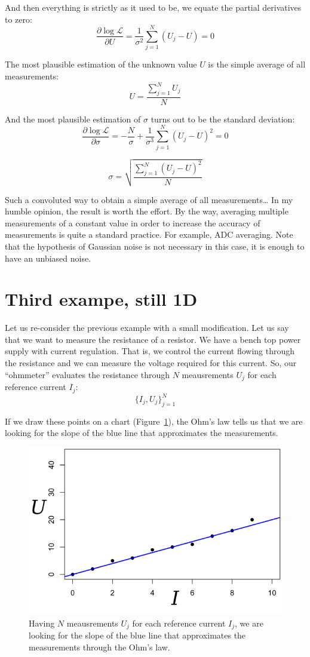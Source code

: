 \documentclass[notitlepage]{report}
\begin{document}
And then everything is strictly as it used to be, we equate the partial derivatives to zero:
$$
\frac{\partial\log\mathcal{L}}{\partial U}    =  \frac{1}{\sigma^2}\sum\limits_{j=1}^N (U_j-U) = 0 
$$

The most plausible estimation of the unknown value $U$ is the simple average of all measurements:
$$
U = \frac{\sum\limits_{j=1}^N U_j}{N}
$$

And the most plausible estimation of $\sigma$ turns out to be the standard deviation:
$$
\frac{\partial\log\mathcal{L}}{\partial\sigma} =  -\frac{N}{\sigma} + \frac{1}{\sigma^3}\sum\limits_{j=1}^N (U_j-U)^2 = 0
$$

$$
\sigma = \sqrt{\frac{\sum\limits_{j=1}^N (U_j-U)^2}{N}} 
$$

Such a convoluted way to obtain a simple average of all measurements\dots
In my humble opinion, the result is worth the effort.
By the way, averaging multiple measurements of a constant value in order to increase the accuracy of measurements is quite a standard practice.
For example, ADC averaging. Note that the hypothesis of Gaussian noise is not necessary in this case, it is enough to have an unbiased noise.


\section{Third exampe, still 1D}

Let us re-consider the previous example with a small modification.
Let us say that we want to measure the resistance of a resistor.
We have a bench top power supply with current regulation.
That is, we control the current flowing through the resistance and we can measure the voltage required for this current.
So, our ``ohmmeter'' evaluates the resistance through $N$ meausrements $U_j$ for each reference current $I_j$:
$$
\{I_j, U_j\}_{j=1}^{N}
$$

If we draw these points on a chart (Figure~\ref{fig:URI}), the Ohm's law tells us that we are looking for the slope of the blue line that approximates the measurements.
\begin{figure}[htb!]
\centering
\includegraphics[width=.5\columnwidth]{URI.png}
\caption{Having $N$ meausrements $U_j$ for each reference current $I_j$, we are looking for the slope of the blue line that approximates the measurements through the Ohm's law.}
\label{fig:URI}
\end{figure}
\end{document}
